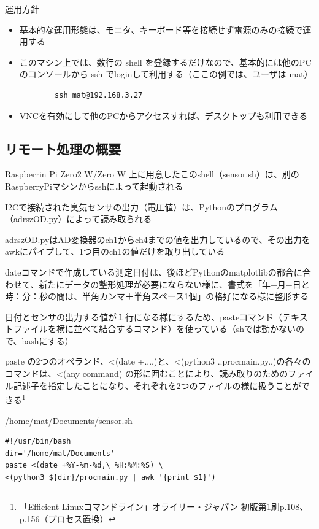 \documentclass[12pt,a4paper,uplatex]{jsarticle}
\begin{document}
運用方針

\begin{itemize}
	\item 基本的な運用形態は、モニタ、キーボード等を接続せず電源のみの接続で運用する
	\item このマシン上では、数行の shell を登録するだけなので、基本的には他のPCのコンソールから ssh でloginして利用する（ここの例では、ユーザは mat）
	\begin{verbatim}
		ssh mat@192.168.3.27
	\end{verbatim}
	\item VNCを有効にして他のPCからアクセスすれば、デスクトップも利用できる
\end{itemize}

\subsection{リモート処理の概要}

	Raspberrin Pi Zero2 W/Zero W  上に用意したこのshell（sensor.sh）は、別のRaspberryPiマシンからsshによって起動される
	
	I2Cで接続された臭気センサの出力（電圧値）は、Pythonのプログラム（adrszOD.py）によって読み取られる
	
	adrszOD.pyはAD変換器のch1からch4までの値を出力しているので、その出力をawkにパイプして、1つ目のch1の値だけを取り出している
	
	dateコマンドで作成している測定日付は、後ほどPythonのmatplotlibの都合に合わせて、新たにデータの整形処理が必要にならない様に、書式を「年−月−日と時：分：秒の間は、半角カンマ＋半角スペース1個」の格好になる様に整形する
	
	日付とセンサの出力する値が１行になる様にするため、pasteコマンド（テキストファイルを横に並べて結合するコマンド）を使っている\footnotemark[1]（shでは動かないので、bashにする）
	
	paste の2つのオペランド、<(date +....)と、<(python3 ..procmain.py..)の各々のコマンドは、<(any command) の形に囲むことにより、読み取りのためのファイル記述子を指定したことになり、それぞれを2つのファイルの様に扱うことができる\footnote[1]{「Efficient Linuxコマンドライン」オライリー・ジャパン 初版第1刷p.108、p.156（プロセス置換）}

\begin{itembox}[l]{/home/mat/Documents/sensor.sh}
	\begin{verbatim}
#!/usr/bin/bash
dir='/home/mat/Documents'
paste <(date +%Y-%m-%d,\ %H:%M:%S) \
<(python3 ${dir}/procmain.py | awk '{print $1}')
	\end{verbatim}
\end{itembox}
\end{document}
